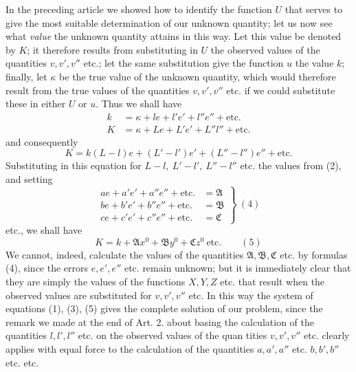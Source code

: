 In the preceding article we showed how to identify the function \(U\) that serves to give the most suitable determination of our unknown quantity; let us now see what \textit{value} the unknown quantity attains in this way. Let this value be denoted by \(K\); it therefore results from substituting in \(U\) the observed values of the quantities \(v,v',v''\) etc.; let the same substitution give the function \(u\) the value \(k\); finally, let \(\kappa\) be the true value of the unknown quantity, which would therefore result from the true values of the quantities \(v,v',v''\) etc. if we could substitute these in either \(U\) or \(u\). Thus we shall have
\[
\begin{aligned}
k&=\kappa+le+l'e'+l''e''+\text{etc.}\\
K&=\kappa+Le+L'e'+L''l''+\text{etc.}
\end{aligned}
\]
and consequently
\[
K=k(L-l)e+(L'-l')e'+(L''-l'')e''+\text{etc.}
\]
Substituting in this equation for \(L-l,\ L'-l',\ L''-l''\) etc. the values from (2), and setting
\[
\left.\begin{aligned}
ae+a'e'+a''e''+\text{etc.}&=\mathfrak A\\
be+b'e'+b''e''+\text{etc.}&=\mathfrak B\\
ce+c'e'+c''e''+\text{etc.}&=\mathfrak C
\end{aligned}\right\}\ (4)
\]
etc., we shall have
\[
K=k+\mathfrak A x^0+\mathfrak B y^0+\mathfrak C z^0\ \text{etc.}\qquad(5)
\]
We cannot, indeed, calculate the values of the quantities \(\mathfrak A,\mathfrak B,\mathfrak C\) etc. by formulas (4), since the errors \(e,e',e''\) etc. remain unknown; but it is immediately clear that they are simply the values of the functions \(X,Y,Z\) etc. that result when the observed values are substituted for \(v,v',v''\) etc. In this way the system of equations (1), (3), (5) gives the complete solution of our problem, since the remark we made at the end of Art. 2. about basing the calculation of the quantities \(l,l',l''\) etc. on the observed values of the quan%
tities \(v,v',v''\) etc. clearly applies with equal force to the calculation of the quantities \(a,a',a''\) etc. \(b,b',b''\) etc. etc.

\clearpage
